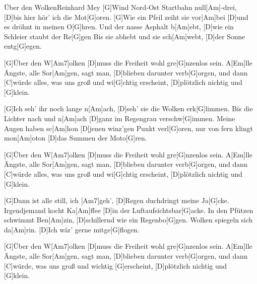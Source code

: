 \documentclass[../main.tex]{subfiles}
\begin{document}
\begin{song}{\"Uber den Wolken}{Reinhard Mey}{}
[G]Wind Nord-Ost Startbahn null[Am]-drei, [D]bis hier hör' ich die Mot[G]oren.
[G]Wie ein Pfeil zeiht sie vor[Am]bei [D]und es dröhnt in meinen O[G]hren.
Und der nasse Asphalt b[Am]ebt, [D]wie ein Schleier staubt der Re[G]gen
Bis sie abhebt und sie sch[Am]webt, [D]der Sonne entg[G]egen.

[G]{Ü}ber den W[Am7]olken
[D]muss die Freiheit wohl gre[G]nzenlos sein.
A[Em]lle Ängste, alle Sor[Am]gen, sagt man,
[D]blieben darunter verb[G]orgen, und dann
[C]würde alles, was uns groß und wi[G]chtig erscheint,
[D]plötzlich nichtig und [G]klein.

[G]Ich seh' ihr noch lange n[Am]ach, [D]seh' sie die Wolken erk[G]limmen.
Bis die Lichter nach und n[Am]ach [D]ganz im Regengrau verschw[G]immen.
Meine Augen haben sc[Am]hon [D]jenen winz'gen Punkt verl[G]oren,
nur von fern klingt mon[Am]oton [D]das Summen der Moto[G]ren.

[G]{Ü}ber den W[Am7]olken
[D]muss die Freiheit wohl gre[G]nzenlos sein.
A[Em]lle Ängste, alle Sor[Am]gen, sagt man,
[D]blieben darunter verb[G]orgen, und dann
[C]würde alles, was uns groß und wi[G]chtig erscheint,
[D]plötzlich nichtig und [G]klein.

[G]Dann ist alle still, ich [Am7]geh', [D]Regen duchdringt meine Ja[G]cke.
Irgendjemand kocht Ka[Am]ffee [D]in der Luftaufsichtsbar[G]acke.
In den Pfützen schwimmt Ben[Am]zin, [D]schillernd wie ein Regenbo[G]gen.
Wolken spiegeln sich da[Am]rin. [D]Ich wär' gerne mitge[G]flogen.

[G]{Ü}ber den W[Am7]olken
[D]muss die Freiheit wohl gre[G]nzenlos sein.
A[Em]lle Ängste, alle Sor[Am]gen, sagt man,
[D]blieben darunter verb[G]orgen, und dann
[C]würde, was uns groß und wichtig [G]erscheint,
[D]plötzlich nichtig und [G]klein.
\end{song}
\end{document}
